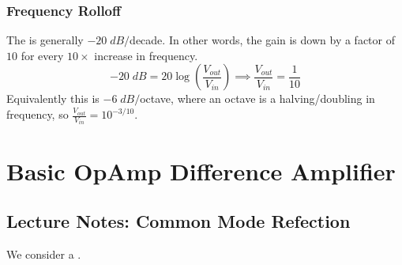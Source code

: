 \subsection{Frequency Rolloff}

The  is generally $-20\;dB/$decade. In other words, the gain is down by a factor of $10$ for every $10\times$ increase in frequency. \begin{equation*}
    -20\;dB = 20\log\left(\frac{V_{out}}{V_{in}}\right) \implies \frac{V_{out}}{V_{in}} = \frac{1}{10}
\end{equation*}
Equivalently this is $-6\;dB/$octave, where an octave is a halving/doubling in frequency, so $\frac{V_{out}}{V_{in}} = 10^{-3/10}$.




\chapter{Basic OpAmp Difference Amplifier}

\section{Lecture Notes: Common Mode Refection}

We consider a .

